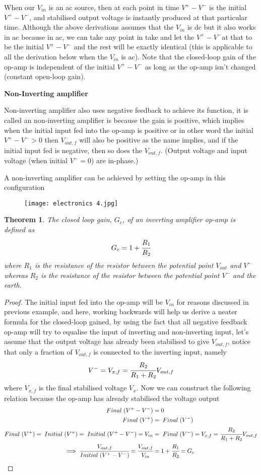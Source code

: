 \documentclass{article}
\newtheorem{theorem}{Theorem}[subsection]
\begin{document}
When our $V_{in}$ is an ac source, then at each point in time $V^+-V^-$ is the initial $V^+-V^-$, and stabilised output voltage is instantly produced at that particular time. Although the above derivations assumes that the $V_{in}$ is dc but it also works in ac because in ac, we can take any point in take and let the $V^+-V^-$at that to be the initial $V^+-V^-$ and the rest will be exactly identical (this is applicable to all the derivation below when the $V_{in}$ is ac). Note that the closed-loop gain of the op-amp is independent of the initial $V^+-V^-$ as long as the op-amp isn't changed (constant open-loop gain).
\begin{flushleft}
\textbf{Non-Inverting amplifier}
\end{flushleft}
 Non-inverting amplifier also uses negative feedback to achieve its function, it is called an non-inverting amplifier is because the gain is positive, which implies when the initial input fed into the op-amp is positive or in other word the initial $V^+-V^->0$ then $V_{out,f}$ will also be positive as the name implies, and if the initial input fed is negative, then so does the $V_{out,f}$. (Output voltage and input voltage (when initial $V^-=0$) are in-phase.)
 
 A non-inverting amplifier can be achieved by setting the op-amp in this configuration
 \begin{figure}[H]
     \centering
     \texttt{[image: electronics 4.jpg]}
 \end{figure}
 
 \begin{theorem}
 The closed loop gain, $G_c$, of an inverting amplifier op-amp is defined as 
 $$G_c=1+\cfrac{R_1}{R_2}$$
 where $R_1$ is the resistance of the resistor between the potential point $V_{out}$ and $V^-$ whereas $R_2$ is the resistance of the resistor between the potential point $V^-$ and the earth.
 \end{theorem}
 \begin{proof}
 The initial input fed into the op-amp will be $V_{in}$ for reasons discussed in previous example, and here, working backwards will help us derive a neater formula for the closed-loop gained, by using the fact that all negative feedback op-amp will try to equalise the input of inverting and non-inverting input, let's assume that the output voltage has already been stabilised to give $V_{out,f}$, notice that only a fraction of $V_{out,f}$ is connected to the inverting input, namely
 $$V^-=V_{x,f}=\cfrac{R_2}{R_1+R_2}V_{out,f}$$
 where $V_{x,f}$ is the final stabilised voltage $V_x$. Now we can construct the following relation because the op-amp has already stabilised the voltage output
 \begin{align*}
     Final\;(V^+-V^-)&=0 \\ 
     Final \; (V^+) &= \; Final \; (V^-) \\ 
     Final \; (V^+) = \; Initial \; (V^+)= \; Initial \; (V^+-V^-)= V_{in} &=\; Final \; (V^-) = V_{x,f}= \cfrac{R_2}{R_1+R_2}V_{out,f}\\
     \implies \cfrac{V_{out,f}}{Initial \; (V^+-V^-)}= \cfrac{V_{out,f}}{V_{in}} &= 1+\cfrac{R_1}{R_2}= G_c
 \end{align*}
\end{proof}
\end{document}
